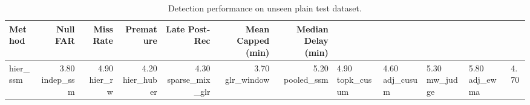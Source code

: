 \begin{table}[htbp]
\centering
\caption{Detection performance on unseen plain test dataset.}
\label{tab:plain_final}
\begin{tabular}{lrrrrrr}
\toprule
Method & Null FAR & Miss Rate & Premature & Late Post-Rec & Mean Capped (min) & Median Delay (min) \\
\midrule
hier_ssm & 3.80%
indep_ssm & 4.90%
hier_rw & 4.20%
hier_huber & 4.30%
sparse_mix_glr & 3.70%
glr_window & 5.20%
pooled_ssm & 4.90%
topk_cusum & 4.60%
adj_cusum & 5.30%
mw_judge & 5.80%
adj_ewma & 4.70%
\bottomrule
\end{tabular}
\end{table}